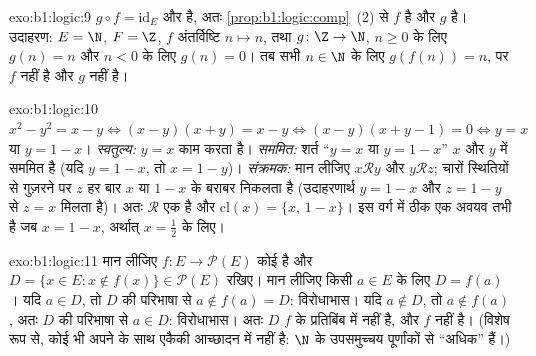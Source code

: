 \begin{solution}{exo:b1:logic:9}
$g \circ f = \mathrm{id}_E$  और  है, अतः
\cref{prop:b1:logic:comp}~(2) से $f$  है और $g$  है। उदाहरण: $E
= \N$, $F = \Z$, $f$ अंतर्विष्टि $n \mapsto n$, तथा $g \colon \Z \to \N$, $n
\geq 0$ के लिए $g(n) = n$ और $n < 0$ के लिए $g(n) = 0$। तब सभी $n \in \N$ के
लिए $g(f(n)) = n$, पर $f$  नहीं है और $g$  नहीं है।
\end{solution}

\begin{solution}{exo:b1:logic:10}
$x^2 - y^2 = x - y \iff (x - y)(x + y) = x - y \iff (x - y)(x + y - 1) = 0
\iff y = x$ या $y = 1 - x$। \emph{स्वतुल्य:} $y = x$ काम करता है।
\emph{सममित:} शर्त ``$y = x$ या $y = 1 - x$'' $x$ और $y$ में सममित है (यदि
$y = 1 - x$, तो $x = 1 - y$)। \emph{संक्रमक:} मान लीजिए $x
\mathbin{\mathcal{R}} y$ और $y \mathbin{\mathcal{R}} z$; चारों स्थितियों से
गुज़रने पर $z$ हर बार $x$ या $1 - x$ के बराबर निकलता है (उदाहरणार्थ $y = 1 -
x$ और $z = 1 - y$ से $z = x$ मिलता है)। अतः $\mathcal{R}$ एक 
है और $\mathrm{cl}(x) = \{x,\, 1 - x\}$। इस वर्ग में ठीक एक अवयव तभी है जब
$x = 1 - x$, अर्थात् $x = \frac12$ के लिए।
\end{solution}

\begin{solution}{exo:b1:logic:11}
मान लीजिए $f \colon E \to \mathcal{P}(E)$ कोई  है और $D = \{x \in
E : x \notin f(x)\} \in \mathcal{P}(E)$ रखिए। मान लीजिए किसी $a \in E$ के
लिए $D = f(a)$। यदि $a \in D$, तो $D$ की परिभाषा से $a \notin f(a) = D$:
विरोधाभास। यदि $a \notin D$, तो $a \notin f(a)$, अतः $D$ की परिभाषा से $a
\in D$: विरोधाभास। अतः $D$ $f$ के प्रतिबिंब में नहीं है, और $f$  नहीं
है। (विशेष रूप से, कोई भी  अपने  के साथ एकैकी आच्छादन में
नहीं है: $\N$ के उपसमुच्चय पूर्णांकों से ``अधिक'' हैं।)
\end{solution}

